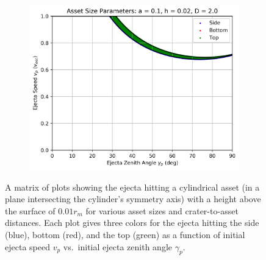 \documentclass{article}
\begin{document}
\begin{figure}
	\begin{subfigure}[t]{.32\textwidth}
		\centering
		\includegraphics[width=.98\linewidth]{asset_speed_zenith_plot_1.010e+00_1.000e-01_2.000e-02_2.000e+00.png}  
		\label{fig:sub-asset_speed_zenith_h1_12}
	\end{subfigure}
	
	\caption{A matrix of plots showing the ejecta hitting a cylindrical asset (in a plane intersecting the cylinder's symmetry axis) with a height above the surface of $0.01 r_m$ for various asset sizes and crater-to-asset distances. Each plot gives three colors for the ejecta hitting the side (blue), bottom (red), and the top (green) as a function of initial ejecta speed $v_p$ vs.\ initial ejecta zenith angle $\gamma_p$.}
	\label{fig:asset_speed_zenith_comparison_h1}
\end{figure}
\end{document}
